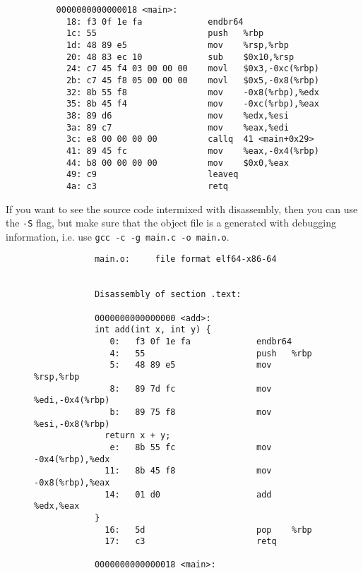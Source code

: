 \begin{theorem}
\begin{lstlisting}
          0000000000000018 <main>:
            18:	f3 0f 1e fa          	endbr64 
            1c:	55                   	push   %rbp
            1d:	48 89 e5             	mov    %rsp,%rbp
            20:	48 83 ec 10          	sub    $0x10,%rsp
            24:	c7 45 f4 03 00 00 00 	movl   $0x3,-0xc(%rbp)
            2b:	c7 45 f8 05 00 00 00 	movl   $0x5,-0x8(%rbp)
            32:	8b 55 f8             	mov    -0x8(%rbp),%edx
            35:	8b 45 f4             	mov    -0xc(%rbp),%eax
            38:	89 d6                	mov    %edx,%esi
            3a:	89 c7                	mov    %eax,%edi
            3c:	e8 00 00 00 00       	callq  41 <main+0x29>
            41:	89 45 fc             	mov    %eax,-0x4(%rbp)
            44:	b8 00 00 00 00       	mov    $0x0,%eax
            49:	c9                   	leaveq 
            4a:	c3                   	retq 
        \end{lstlisting}

        If you want to see the source code intermixed with disassembly, then you can use the \texttt{-S} flag, but make sure that the object file is a generated with debugging information, i.e. use \texttt{gcc -c -g main.c -o main.o}. 
        \begin{figure}[H]
          \centering 
          \begin{lstlisting}
            main.o:     file format elf64-x86-64


            Disassembly of section .text:

            0000000000000000 <add>:
            int add(int x, int y) {
               0:	f3 0f 1e fa          	endbr64 
               4:	55                   	push   %rbp
               5:	48 89 e5             	mov    %rsp,%rbp
               8:	89 7d fc             	mov    %edi,-0x4(%rbp)
               b:	89 75 f8             	mov    %esi,-0x8(%rbp)
              return x + y; 
               e:	8b 55 fc             	mov    -0x4(%rbp),%edx
              11:	8b 45 f8             	mov    -0x8(%rbp),%eax
              14:	01 d0                	add    %edx,%eax
            }
              16:	5d                   	pop    %rbp
              17:	c3                   	retq   

            0000000000000018 <main>:


\end{lstlisting}
\end{figure}
\end{theorem}
